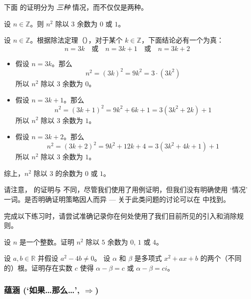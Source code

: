 下面  的证明分为 \textit{三种} 情况，而不仅仅是两种。

\begin{proposition}
\label{propRemainderOfSquaresModulo3}
设 $n \in \mathbb{Z}$。则 $n^2$ 除以 $3$ 余数为 $0$ 或 $1$。
\end{proposition}

\begin{cproof}
设 $n \in \mathbb{Z}$。根据除法定理（），对于某个 $k \in \mathbb{Z}$，下面结论必有一个为真：
\[
n=3k \quad \text{或} \quad n=3k+1 \quad \text{或} \quad n=3k+2
\]
\begin{itemize}
\item 假设 $n=3k$。那么
\[
n^2 = (3k)^2 = 9k^2 = 3 \cdot (3k^2)
\]
所以 $n^2$ 除以 $3$ 余数为 $0$。
\item 假设 $n=3k+1$。那么
\[
n^2 = (3k+1)^2 = 9k^2+6k+1 = 3(3k^2+2k)+1
\]
所以 $n^2$ 除以 $3$ 余数为 $1$。
\item 假设 $n=3k+2$。那么
\[
n^2 = (3k+2)^2 = 9k^2+12k+4 = 3(3k^2+4k+1)+1
\]
所以 $n^2$ 除以 $3$ 余数为 $1$。
\end{itemize}
综上，$n^2$ 除以 $3$ 的余数为 $0$ 或 $1$。
\end{cproof}

请注意， 的证明与  不同，尽管我们使用了用例证明，但我们没有明确使用 `情况' 一词。是否明确证明策略因人而异 --- 关于此类问题的讨论可以在  中找到。

完成以下练习时，请尝试准确记录你在何处使用了我们目前所见的引入和消除规则。

\begin{exercise}
设 $n$ 是一个整数。证明 $n^2$ 除以 $5$ 余数为 $0$, $1$ 或 $4$。
\end{exercise}

\begin{exercise}
设 $a,b \in \mathbb{R}$ 并假设 $a^2-4b \ne 0$。 设 $\alpha$ 和 $\beta$ 是多项式 $x^2+ax+b$ 的两个（不同的）根。证明存在实数 $c$ 使得 $\alpha-\beta = c$ 或 $\alpha - \beta = ci$。
\end{exercise}

\subsubsection*{蕴涵 (`如果\dots{}那么\dots{}', $\Rightarrow$)}

